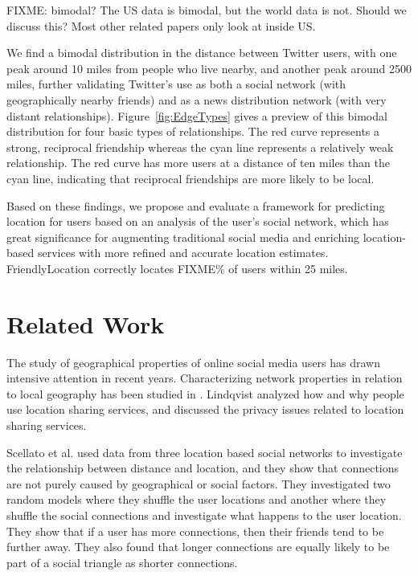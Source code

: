 FIXME: bimodal? The US data is bimodal, but the world data is not. Should we
discuss this? Most other related papers only look at inside US.

We find a bimodal distribution in the distance between Twitter users, with one
peak around 10 miles from people who live nearby, and another peak around 2500
miles, further validating Twitter's use as both a social network (with
geographically nearby friends) and as a news distribution network (with very
distant relationships).  Figure~\ref{fig:EdgeTypes} gives a preview of this
bimodal distribution for four basic types of relationships.  The red curve
represents a strong, reciprocal friendship whereas the cyan line represents a
relatively weak relationship. The red curve has more users at a distance of ten
miles than the cyan line, indicating that reciprocal friendships are more
likely to be local.

Based on these findings, we propose and evaluate a framework for predicting
location for users based on an analysis of the user's social network,
which has great significance for augmenting traditional social media and
enriching location-based services with more refined and accurate location
estimates.  FriendlyLocation correctly locates FIXME\% of users within 25 miles.

\section{Related Work}


The study of geographical properties of online social media users has drawn
intensive attention in recent years.  Characterizing network properties in
relation to local geography has been studied in \cite{yardi2010tweeting}.
Lindqvist \cite{lindqvist2011m} analyzed how and why people use location
sharing services, and discussed the privacy issues related to location sharing
services.

Scellato et al. \cite{scellato2011socio} used data from three location based
social networks to investigate the relationship between distance and location,
and they show that connections are not purely caused by geographical or social
factors.  They investigated two random models where they shuffle the user
locations and another where they shuffle the social connections and investigate
what happens to the user location.  They show that if a user has more
connections, then their friends tend to be further away.  They also found that
longer connections are equally likely to be part of a social triangle as
shorter connections.

